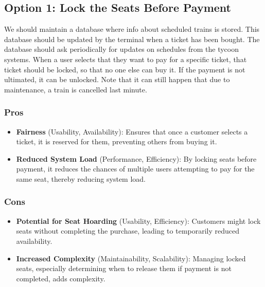 \subsection*{Option 1: Lock the Seats Before Payment}
We should maintain a database where info about scheduled trains is stored. This database should be updated by the terminal when a ticket has been bought. The database should ask periodically for updates on schedules from the tycoon systems. When a user selects that they want to pay for a specific ticket, that ticket should be locked, so that no one else can buy it. If the payment is not ultimated, it can be unlocked. Note that it can still happen that due to maintenance, a train is cancelled last minute. 


\subsubsection*{Pros}
\begin{itemize}[noitemsep]
    \item \textbf{Fairness} (Usability, Availability): Ensures that once a customer selects a ticket, it is reserved for them, preventing others from buying it.
    \item \textbf{Reduced System Load} (Performance, Efficiency): By locking seats before payment, it reduces the chances of multiple users attempting to pay for the same seat, thereby reducing system load.
\end{itemize}
\subsubsection*{Cons}
\begin{itemize}[noitemsep]
    \item \textbf{Potential for Seat Hoarding} (Usability, Efficiency): Customers might lock seats without completing the purchase, leading to temporarily reduced availability.
    \item \textbf{Increased Complexity} (Maintainability, Scalability): Managing locked seats, especially determining when to release them if payment is not completed, adds complexity.
\end{itemize}
